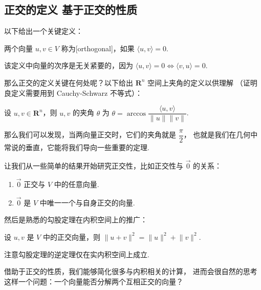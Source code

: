 \subsection{正交的定义 \quad 基于正交的性质}

以下给出一个关键定义：

\begin{definition}
    两个向量 $u, v \in V$ 称为[orthogonal]，如果 $\langle u, v\rangle = 0$.
\end{definition}

该定义中向量的次序是无关紧要的，因为 $\langle u, v\rangle = 0 \iff \langle v, u\rangle = 0$.

\vspace{2ex}

那么正交的定义关键在何处呢？以下给出 $\mathbf{R}^{n}$ 空间上夹角的定义以供理解
（证明良定义需要用到 Cauchy-Schwarz 不等式）：

\begin{definition}
    设 $u, v \in \mathbf{R}^{n}$，则 $u, v$ 的夹角 $ \theta $ 为
    $ \theta = \arccos \dfrac{\langle u, v\rangle}{\lVert u \rVert \lVert v \rVert}$.
\end{definition}

那么我们可以发现，当两向量正交时，它们的夹角就是 $\dfrac{\pi}{2}$，
也就是我们在几何中常说的垂直，它能将我们导向一些重要的定理.

\vspace{2ex}

让我们从一些简单的结果开始研究正交性，比如正交性与 $ \vec{0} $ 的关系：

\begin{enumerate}
    \item $ \vec{0} $ 正交与 $V$ 中的任意向量.

    \item $ \vec{0} $ 是 $V$ 中唯一一个与自身正交的向量.
\end{enumerate}

然后是熟悉的勾股定理在内积空间上的推广：

\begin{theorem}
    设 $u, v$ 是 $V$ 中的正交向量，则 $\lVert u + v \rVert^2 = \lVert u \rVert^2 + \lVert v \rVert^2 $.
\end{theorem}

注意勾股定理的逆定理仅在实内积空间上成立.

\vspace{2ex}

借助于正交的性质，我们能够简化很多与内积相关的计算，
进而会很自然的思考这样一个问题：一个向量能否分解两个互相正交的向量？

